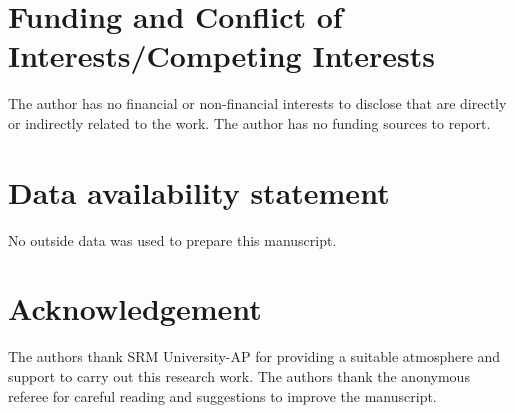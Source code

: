 \documentclass[12pt, 14paper]{amsart}
\theoremstyle{plain}
\numberwithin{equation}{section}
\begin{document}
\section*{Funding and Conflict of Interests/Competing Interests} The author has no financial or non-financial interests to disclose that are directly or indirectly related to the work. The author has no funding sources to report.

\section*{Data availability statement} No outside data was used to prepare this manuscript.



\section*{Acknowledgement}
The authors thank SRM University-AP for providing a suitable atmosphere and support to carry out this research work. The authors thank the anonymous referee for careful reading and suggestions to improve the manuscript.

\end{document}
